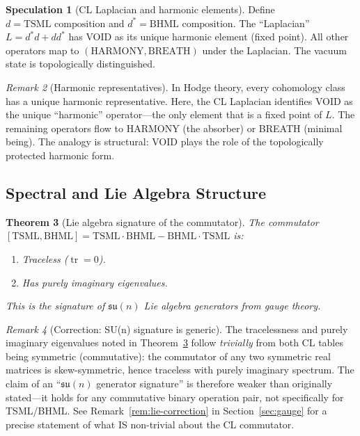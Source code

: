 \documentclass[11pt]{article}
\newtheorem{theorem}{Theorem}[section]
\theoremstyle{definition}
\newtheorem{speculation}[theorem]{Speculation}
\theoremstyle{remark}
\newtheorem{remark}[theorem]{Remark}
\begin{document}
\begin{speculation}[CL Laplacian and harmonic elements]
\label{spec:hodge}
Define $d = \text{TSML composition}$ and $d^* = \text{BHML composition}$.  The
``Laplacian'' $L = d^* d + d d^*$ has VOID as its unique harmonic element
(fixed point).  All other operators map to $(\text{HARMONY}, \text{BREATH})$
under the Laplacian.  The vacuum state is topologically distinguished.
\end{speculation}

\begin{remark}[Harmonic representatives]
In Hodge theory, every cohomology class has a unique harmonic representative.
Here, the CL Laplacian identifies VOID as the unique ``harmonic'' operator---the
only element that is a fixed point of $L$.  The remaining operators flow to
HARMONY (the absorber) or BREATH (minimal being).  The analogy is structural:
VOID plays the role of the topologically protected harmonic form.
\end{remark}

\subsection{Spectral and Lie Algebra Structure}
\label{sec:lie-algebra}

\begin{theorem}[Lie algebra signature of the commutator]
\label{thm:lie-algebra}
The commutator $[\text{TSML}, \text{BHML}] = \text{TSML} \cdot \text{BHML}
- \text{BHML} \cdot \text{TSML}$ is:
\begin{enumerate}[nosep]
  \item Traceless ($\operatorname{tr} = 0$).
  \item Has purely imaginary eigenvalues.
\end{enumerate}
This is the signature of $\mathfrak{su}(n)$ Lie algebra generators from
gauge theory.
\end{theorem}

\begin{remark}[Correction: SU(n) signature is generic]
\label{rem:su-correction}
The tracelessness and purely imaginary eigenvalues noted in
Theorem~\ref{thm:lie-algebra} follow \emph{trivially} from both CL tables being
symmetric (commutative): the commutator of any two symmetric real matrices is
skew-symmetric, hence traceless with purely imaginary spectrum.  The claim of an
``$\mathfrak{su}(n)$ generator signature'' is therefore weaker than originally
stated---it holds for any commutative binary operation pair, not specifically for
TSML/BHML.  See Remark~\ref{rem:lie-correction} in
Section~\ref{sec:gauge} for a precise statement of what IS non-trivial
about the CL commutator.
\end{remark}
\end{document}
